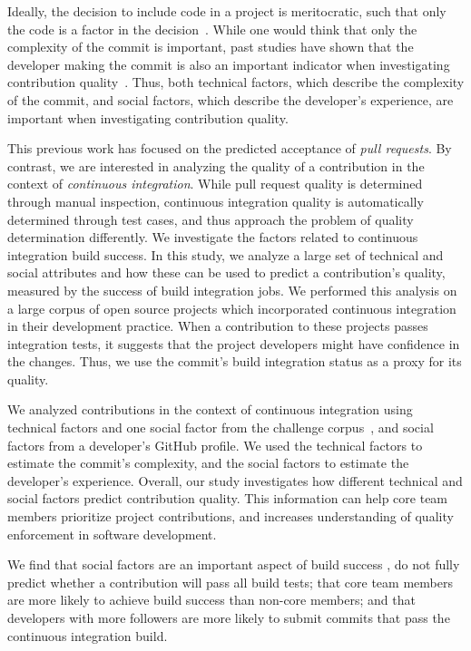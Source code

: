 \documentclass[10pt, conference]{IEEEtran}
\begin{document}
Ideally, the decision to include code in
a project is meritocratic, such that only the code is a factor
in the decision~\cite{Scacchi07}.
While one would think that only the complexity of the commit is important, past
studies have shown that the developer making the commit is also an important
indicator when investigating contribution quality~\cite{tsay14icse, tsay14fse}.
Thus, both technical factors, which describe the complexity of the commit, and
social factors, which describe the developer's experience, are important when
investigating contribution quality.

This previous work has focused on the predicted acceptance of \emph{pull requests}. 
By contrast,  we are interested in analyzing the quality 
of a contribution in the context of \emph{continuous integration}.  While pull request
quality is determined through manual inspection, continuous integration quality
is automatically determined through test cases, and thus approach the problem of
quality determination differently.
We investigate the factors related to continuous integration build success.
In this study, we analyze a large set of technical and social attributes 
and how these can be used to predict a contribution's quality, measured by the
success of build integration jobs.
We performed this analysis on a large corpus of open source projects
which incorporated continuous integration in their development practice. 
When a contribution to these projects passes integration tests, 
it suggests that the project developers
might have confidence in the changes. 
Thus, we use the commit's build integration status as a proxy for its quality.

We analyzed contributions in the 
context of continuous integration using technical factors and one social
factor from the challenge
corpus~\cite{msr17challenge}, and social factors from a developer's
GitHub profile.  We used the technical factors to estimate the commit's
complexity, and the social factors to estimate the developer's experience.
Overall, our study investigates how different technical and social factors predict
contribution quality. This information can help core team members prioritize project
contributions, and increases understanding of quality enforcement
in software development.

We find that social factors are an important aspect of build success ,
do not fully predict whether a contribution will 
pass all build tests;
that core team members are more likely to achieve build success than non-core
members; and that developers with more followers are more likely to submit commits that pass the
continuous integration build.
\end{document}
